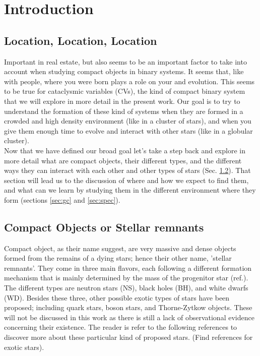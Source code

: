 \chapter{Introduction}
\thispagestyle{fancy}

\section{Location, Location, Location}

Important in real estate, but also seems to be an important factor to take into account when studying compact objects in binary systems. It seems that, like with people, where you were born plays a role on your and evolution. This seems to be true for cataclysmic variables (CVs), the kind of compact binary system that we will explore in more detail in the present work. Our goal is to try to understand the formation of these kind of systems when they are formed in a crowded and high density environment (like in a cluster of stars), and when you give them enough time to evolve and interact with other stars (like in a globular cluster). \\ 

Now that we have defined our broad goal let's take a step back and explore in more detail what are compact objects, their different types, and the different ways they can interact with each other and other types of stars (Sec. \ref{sec:co}). That section will lead us to the discussion of where and how we expect to find them, and what can we learn by studying them in the different environment where they form (sections \ref{sec:gc} and \ref{sec:spec}).

\section{Compact Objects or Stellar remnants}\label{sec:co}

Compact object, as their name suggest, are very massive and dense objects formed from the remains of a dying stars; hence their other name, 'stellar remnants'. They come in three main flavors, each following a different formation mechanism that is mainly determined by the mass of the progenitor star (ref.). The different types are neutron stars (NS), black holes (BH), and white dwarfs (WD). Besides these three, other possible exotic types of stars have been proposed; including quark stars, boson stars, and Thorne-Zytkow objects. These will not be discussed in this work as there is still a lack of observational evidence concerning their existence. The reader is refer to the following references to discover more about these particular kind of proposed stars. (Find references for exotic stars). \\

